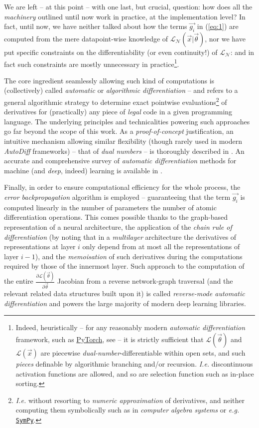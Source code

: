 We are left -- at this point -- with one last, but crucial, question: how does all the \textit{machinery} outlined until now work in practice, at the implementation level? In fact, until now, we have neither talked about how the terms $\vec{g_i}$ in (\ref{eq:1}) are computed from the mere datapoint-wise knowledge of $\mathcal{L}_{\mathcal{N}}(\vec{x}|\vec{\theta})$, nor we have put specific constraints on the differentiability (or even continuity!) of $\mathcal{L}_{\mathcal{N}}$: and in fact such constraints are mostly unnecessary in practice\footnote{Indeed, heuristically -- for any reasonably modern \textit{automatic differentiation} framework, such as \href{https://pytorch.org/}{PyTorch}, see \cite{PaszkeEtAl2019PyTorch} -- it is strictly sufficient that $\mathcal{L}(\vec{\theta})$ and $\mathcal{L}(\vec{x})$ are piecewise \textit{dual-number}-differentiable within open sets, and such \textit{pieces} definable by algorithmic branching and/or recursion. \textit{I.e.} discontinuous activation functions are allowed, and so are selection function such as in-place sorting.}.

The core ingredient seamlessly allowing such kind of computations is (collectively) called \textit{automatic} or \textit{algorithmic} \textit{differentiation} -- and refers to a general algorithmic strategy to determine exact pointwise evaluations\footnote{\textit{I.e.} without resorting to \textit{numeric approximation} of derivatives, and neither computing them symbolically such as in \textit{computer algebra systems} or \textit{e.g.} \href{https://www.sympy.org/}{\texttt{SymPy}}.} of derivatives for (practically) any piece of \textit{legal} code in a given programming language. The underlying principles and technicalities powering such approaches go far beyond the scope of this work. As a \textit{proof-of-concept} justification, an intuitive mechanism allowing similar flexibility (though rarely used in modern \textit{AutoDiff} frameworks) -- that of \textit{dual numbers} -- is thoroughly described in \cite{Fischer1998DualNumbers}. An accurate and comprehensive survey of \textit{automatic differentiation} methods for machine (and \textit{deep}, indeed) learning is available in \cite{BaydinEtAl2018AutoDiff}.

Finally, in order to ensure computational efficiency for the whole process, the \textit{error backpropagation} algorithm is employed -- guaranteeing that the term $\vec{g_i}$ is computed linearly in the number of parameters \wrt the number of atomic differentiation operations. This comes possible thanks to the graph-based representation of a neural architecture, the application of the \textit{chain rule of differentiation} (by noting that in a \textit{multilayer} architecture the derivatives of representations at layer $i$ only depend from at most all the representations of layer $i-1$), and the \textit{memoisation} of such derivatives during the computations required by those of the innermost layer. Such approach to the computation of the entire $\frac{\partial\mathcal{L}(\vec{\theta})}{\partial\vec{\theta}}$ Jacobian from a reverse network-graph traversal (and the relevant related data structures built upon it) is called \textit{reverse-mode automatic differentiation} and powers the large majority of modern deep learning libraries.

